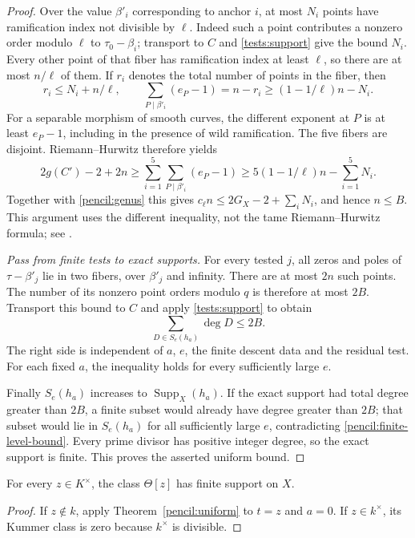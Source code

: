 \begin{proof}
Over the value $\beta'_i$ corresponding to anchor $i$, at most $N_i$
points have ramification index not divisible by $\ell$.
Indeed such a point contributes a nonzero order modulo $\ell$ to
$\tau_0-\beta_i$; transport to $C$ and
\eqref{tests:support} give the bound $N_i$.
Every other point of that fiber has ramification index at least
$\ell$, so there are at most $n/\ell$ of them.
If $r_i$ denotes the total number of points in the fiber, then
\[
 r_i\le N_i+n/\ell,\qquad
 \sum_{P\mid\beta'_i}(e_P-1)=n-r_i
       \ge(1-1/\ell)n-N_i.
\]
For a separable morphism of smooth curves, the different exponent at
$P$ is at least $e_P-1$, including in the presence of wild ramification.
The five fibers are disjoint.  Riemann--Hurwitz therefore yields
\[
 2g(C')-2+2n
 \ge\sum_{i=1}^5\sum_{P\mid\beta'_i}(e_P-1)
 \ge5(1-1/\ell)n-\sum_{i=1}^5N_i.
\]
Together with \eqref{pencil:genus} this gives $c_\ell n\le
2G_X-2+\sum_iN_i$, and hence $n\le B$.
This argument uses the different inequality, not the tame
Riemann--Hurwitz formula; see \cite[Section~53.12, Tag~0C1B]{Stacks}.

\emph{Pass from finite tests to exact supports.}
For every tested $j$, all zeros and poles of $\tau-\beta'_j$ lie in two
fibers, over $\beta'_j$ and infinity.  There are at most $2n$ such
points.  The number of its nonzero point orders modulo $q$ is therefore
at most $2B$.
Transport this bound to $C$ and apply \eqref{tests:support} to obtain
\begin{equation}\label{pencil:finite-level-bound}
 \sum_{D\in S_e(h_a)}\deg D\le2B.
\end{equation}
The right side is independent of $a$, $e$, the finite descent data and
the residual test.  For each fixed $a$, the inequality holds for every
sufficiently large $e$.

Finally $S_e(h_a)$ increases to $\operatorname{Supp}_X(h_a)$.
If the exact support had total degree greater than $2B$, a finite
subset would already have degree greater than $2B$; that subset would
lie in $S_e(h_a)$ for all sufficiently large $e$, contradicting
\eqref{pencil:finite-level-bound}.
Every prime divisor has positive integer degree, so the exact support
is finite.  This proves the asserted uniform bound.
\end{proof}

\begin{corollary}\label{pencil:finite}
For every $z\in K^\times$, the class $\Theta[z]$ has finite support on
$X$.
\end{corollary}

\begin{proof}
If $z\notin k$, apply Theorem~\ref{pencil:uniform} to $t=z$ and $a=0$.
If $z\in k^\times$, its Kummer class is zero because $k^\times$ is
divisible.
\end{proof}
